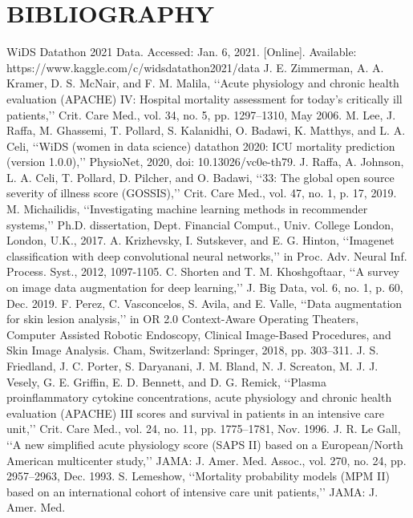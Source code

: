 
\section{BIBLIOGRAPHY}
\begin{thebibliography}{00}
 WiDS Datathon 2021 Data. Accessed: Jan. 6, 2021. [Online]. Available:
https://www.kaggle.com/c/widsdatathon2021/data
J. E. Zimmerman, A. A. Kramer, D. S. McNair, and F. M. Malila, ‘‘Acute
physiology and chronic health evaluation (APACHE) IV: Hospital mortality assessment for today’s critically ill patients,’’ Crit. Care Med., vol. 34,
no. 5, pp. 1297–1310, May 2006.
  M. Lee, J. Raffa, M. Ghassemi, T. Pollard, S. Kalanidhi, O. Badawi,
K. Matthys, and L. A. Celi, ‘‘WiDS (women in data science) datathon
2020: ICU mortality prediction (version 1.0.0),’’ PhysioNet, 2020,
doi: 10.13026/vc0e-th79.
J. Raffa, A. Johnson, L. A. Celi, T. Pollard, D. Pilcher, and O. Badawi,
‘‘33: The global open source severity of illness score (GOSSIS),’’ Crit.
Care Med., vol. 47, no. 1, p. 17, 2019.
M. Michailidis, ‘‘Investigating machine learning methods in recommender
systems,’’ Ph.D. dissertation, Dept. Financial Comput., Univ. College London, London, U.K., 2017.
 A. Krizhevsky, I. Sutskever, and E. G. Hinton, ‘‘Imagenet classification
with deep convolutional neural networks,’’ in Proc. Adv. Neural Inf. Process. Syst., 2012, 1097-1105.
C. Shorten and T. M. Khoshgoftaar, ‘‘A survey on image data augmentation
for deep learning,’’ J. Big Data, vol. 6, no. 1, p. 60, Dec. 2019.
F. Perez, C. Vasconcelos, S. Avila, and E. Valle, ‘‘Data augmentation for
skin lesion analysis,’’ in OR 2.0 Context-Aware Operating Theaters, Computer Assisted Robotic Endoscopy, Clinical Image-Based Procedures, and
Skin Image Analysis. Cham, Switzerland: Springer, 2018, pp. 303–311.
 J. S. Friedland, J. C. Porter, S. Daryanani, J. M. Bland, N. J. Screaton,
M. J. J. Vesely, G. E. Griffin, E. D. Bennett, and D. G. Remick, ‘‘Plasma
proinflammatory cytokine concentrations, acute physiology and chronic
health evaluation (APACHE) III scores and survival in patients in an
intensive care unit,’’ Crit. Care Med., vol. 24, no. 11, pp. 1775–1781,
Nov. 1996.
 J. R. Le Gall, ‘‘A new simplified acute physiology score (SAPS II) based
on a European/North American multicenter study,’’ JAMA: J. Amer. Med.
Assoc., vol. 270, no. 24, pp. 2957–2963, Dec. 1993.
 S. Lemeshow, ‘‘Mortality probability models (MPM II) based on an international cohort of intensive care unit patients,’’ JAMA: J. Amer. Med.

\end{thebibliography}
